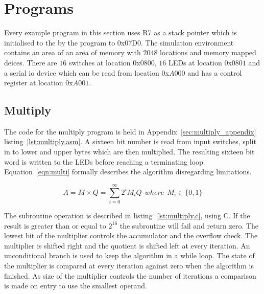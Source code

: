 

\section{Programs}
Every example program in this section uses R7 as a stack pointer which is initialised to the by the program to 0x07D0.%
The simulation environment contains an area of an area of memory with $2048$ locations and memory mapped deices.
There are $16$ switches at location $0$x$0800$, $16$ LEDs at location $0$x$0801$ and a serial io device which can be read from location $0$x$A000$ and has a control register at location $0$x$A001$. 




\subsection{Multiply}
\label{sec:multiply}
The code for the multiply program is held in Appendix~\ref{sec:multiply_appendix} listing~\ref{lst:multiply.asm}.
A sixteen bit number is read from input switches, split in to lower and upper bytes which are then multiplied.
The resulting sixteen bit word is written to the LEDs before reaching a terminating loop.
Equation~\eqref{eqn:multi} formally describes the algorithm disregarding limitations.

\begin{equation}
	A = M \times Q = \sum_{i=0}^{\infty} 2^i M_i Q\:\:where\:\:M_i \in \{0,1\}
   \label{eqn:multi}
\end{equation}



The subroutine operation is described in listing~\ref{lst:multiply.c}, using C. 
If the result is greater than or equal to $2^{16}$ the subroutine will fail and return zero.
The lowest bit of the multiplier controls the accumulator and the overflow check.
The multiplier is shifted right and the quotient is shifted left at every iteration.
An unconditional branch is used to keep the algorithm in a while loop. 
The state of the multiplier is compared at every iteration against zero when the algorithm is finished.
As size of the multiplier controls the number of iterations a comparison is made on entry to use the smallest operand.










